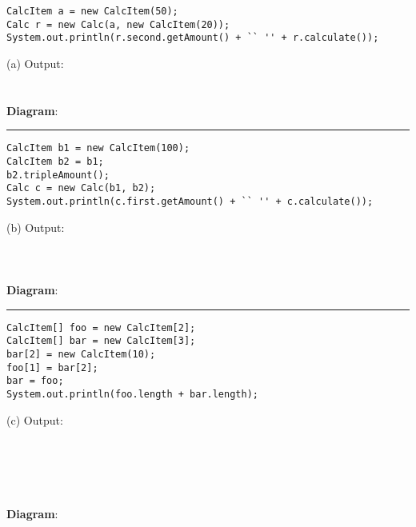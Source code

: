 \documentclass[12pt,twoside]{article}
\newcommand{\fillInBlank}[1][0.5in]{\underline{\hspace{#1}}}
\begin{document}
\begin{minipage}[t]{0.68\linewidth}
\begin{lstlisting}
CalcItem a = new CalcItem(50);
Calc r = new Calc(a, new CalcItem(20));
System.out.println(r.second.getAmount() + `` '' + r.calculate());
\end{lstlisting}
\end{minipage}
\hspace{0.25in}
\begin{minipage}[t]{0.3\linewidth}
\vspace*{1 mm} 
(a) Output: \fillInBlank[1in]\\
\\ \\
\textbf{Diagram}:
\end{minipage}

\vfill
\hrule
\begin{minipage}[t]{0.68\linewidth}
\begin{lstlisting}
CalcItem b1 = new CalcItem(100);
CalcItem b2 = b1;
b2.tripleAmount();
Calc c = new Calc(b1, b2);
System.out.println(c.first.getAmount() + `` '' + c.calculate());	
\end{lstlisting}
\end{minipage}
\hspace{0.25in}
\begin{minipage}[t]{0.3\linewidth}
\vspace{0.1in}
(b) Output: \fillInBlank[1in]\\
\\ \\ \\
\textbf{Diagram}:
\end{minipage}

\vfill
\hrule
\begin{minipage}[t]{0.68\linewidth}
\begin{lstlisting}
CalcItem[] foo = new CalcItem[2];
CalcItem[] bar = new CalcItem[3];
bar[2] = new CalcItem(10);
foo[1] = bar[2];
bar = foo;
System.out.println(foo.length + bar.length);
\end{lstlisting}
\end{minipage}
\hspace{0.25in}
\begin{minipage}[t]{0.3\linewidth}
\vspace{0.1in}
(c) Output: \fillInBlank[1in]\\
\\ \\ \\ \\ \\
\textbf {Diagram}:
\end{minipage}
\vfill
\end{document}
